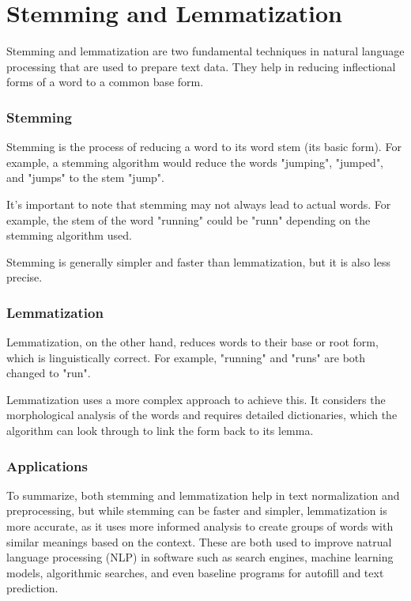 \chapter{Stemming and Lemmatization}

Stemming and lemmatization are two fundamental techniques in natural language processing that are used to prepare text data. They help in reducing inflectional forms of a word to a common base form. 

\subsection{Stemming}

Stemming is the process of reducing a word to its word stem (its basic form). For example, a stemming algorithm would reduce the words "jumping", "jumped", and "jumps" to the stem "jump".

It's important to note that stemming may not always lead to actual words. For example, the stem of the word "running" could be "runn" depending on the stemming algorithm used.

Stemming is generally simpler and faster than lemmatization, but it is also less precise.

\subsection{Lemmatization}

Lemmatization, on the other hand, reduces words to their base or root form, which is linguistically correct. For example, "running" and "runs" are both changed to "run".

Lemmatization uses a more complex approach to achieve this. It considers the morphological analysis of the words and requires detailed dictionaries, which the algorithm can look through to link the form back to its lemma.

\subsection{Applications}
To summarize, both stemming and lemmatization help in text normalization and preprocessing, but while stemming can be faster and simpler, lemmatization is more accurate, as it uses more informed analysis to create groups of words with similar meanings based on the context. These are both used to improve natrual language processing (NLP) in software such as search engines, machine learning models, algorithmic searches, and even baseline programs for autofill and text prediction. 
